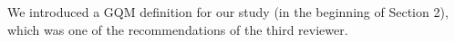 
We introduced a GQM definition for our study (in the
beginning of Section 2), which was one of the
recommendations of the third reviewer. 
